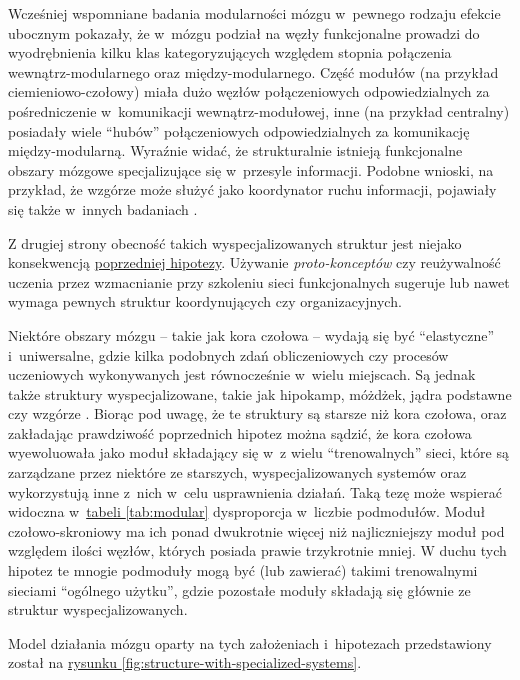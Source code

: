 Wcześniej wspomniane badania modularności mózgu \cite{meunier2009hierarchical} w~pewnego rodzaju efekcie ubocznym pokazały, że w~mózgu podział na węzły funkcjonalne prowadzi do wyodrębnienia kilku klas kategoryzujących względem stopnia połączenia wewnątrz-modularnego oraz między-modularnego.
Część modułów (na przykład ciemieniowo-czołowy) miała dużo węzłów połączeniowych odpowiedzialnych za pośredniczenie w~komunikacji wewnątrz-modułowej, inne (na przykład centralny) posiadały wiele ``hubów'' połączeniowych odpowiedzialnych za komunikację między-modularną.
Wyraźnie widać, że strukturalnie istnieją funkcjonalne obszary mózgowe specjalizujące się w~przesyle informacji.
Podobne wnioski, na przykład, że wzgórze może służyć jako koordynator ruchu informacji, pojawiały się także w~innych badaniach \cite{sherman2005thalamic}.

Z drugiej strony obecność takich wyspecjalizowanych struktur jest niejako konsekwencją \hyperref[subsec:cost-function-is-diverse]{poprzedniej hipotezy}.
Używanie \emph{proto-konceptów} czy reużywalność uczenia przez wzmacnianie przy szkoleniu sieci funkcjonalnych sugeruje lub nawet wymaga pewnych struktur koordynujących czy organizacyjnych.

Niektóre obszary mózgu -- takie jak kora czołowa -- wydają się być ``elastyczne'' i~uniwersalne, gdzie kilka podobnych zdań obliczeniowych czy procesów uczeniowych wykonywanych jest równocześnie w~wielu miejscach.
Są jednak także struktury wyspecjalizowane, takie jak hipokamp, móżdżek, jądra podstawne czy wzgórze \cite{solari2011cognitive}.
Biorąc pod uwagę, że te struktury są starsze niż kora czołowa, oraz zakładając prawdziwość poprzednich hipotez można sądzić, że kora czołowa wyewoluowała jako  moduł składający się w~z wielu ``trenowalnych'' sieci, które są zarządzane przez niektóre ze starszych, wyspecjalizowanych systemów oraz wykorzystują inne z~nich w~celu usprawnienia działań.
Taką tezę może wspierać widoczna w~\hyperref[tab:modular]{tabeli \ref*{tab:modular}} dysproporcja w~liczbie podmodułów.
Moduł czołowo-skroniowy ma ich ponad dwukrotnie więcej niż najliczniejszy moduł pod względem ilości węzłów, których posiada prawie trzykrotnie mniej.
W duchu tych hipotez te mnogie podmoduły mogą być (lub zawierać) takimi trenowalnymi sieciami ``ogólnego użytku'', gdzie pozostałe moduły składają się głównie ze struktur wyspecjalizowanych.

Model działania mózgu oparty na tych założeniach i~hipotezach przedstawiony został na \hyperref[fig:structure-with-specialized-systems]{rysunku \ref*{fig:structure-with-specialized-systems}}.

